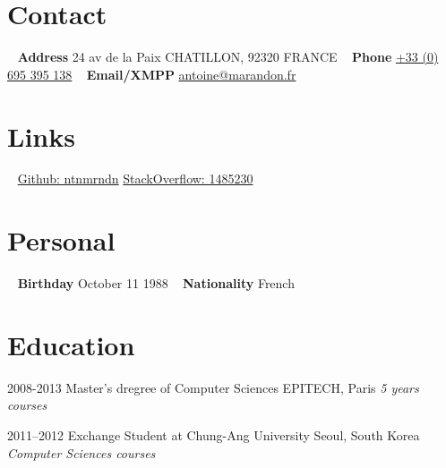 \documentclass[]{template/friggeri-cv} %
\begin{document}


\begin{aside} %
\section{Contact}
~
\textbf{Address}
24 av de la Paix
CHATILLON, 92320
FRANCE
~
\textbf{Phone}
\href{tel:0033695395169}{+33 (0) 695 395 138}
~
\textbf{Email/XMPP}
\href{mailto:antoine@marandon.fr}{antoine@marandon.fr}
\section {Links}
~
\href{https://github.com/ntnmrndn}{Github: ntnmrndn}
\href{http://stackoverflow.com/users/1485230/}{StackOverflow: 1485230}
\section{Personal}
~
\textbf{Birthday}
October 11 1988
~
\textbf{Nationality}
French
\end{aside}


\section{Education}

\begin{entrylist}


\entry
{2008-2013}
{Master's dregree {\normalfont of Computer Sciences}}
{EPITECH, Paris}
{\emph{5 years courses}}


\entry
{2011--2012}
{Exchange Student {\normalfont at Chung-Ang University}}
{Seoul, South Korea}
{\emph{Computer Sciences courses}}


\end{entrylist}
\end{document}
